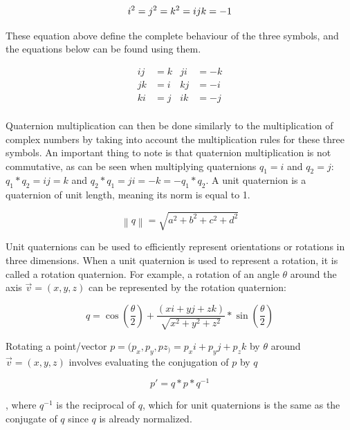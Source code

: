 		\begin{equation}
			i^2 = j^2 = k^2 = ijk = -1 \\
		\end{equation}
		
		These equation above define the complete behaviour of the three symbols, and the equations below can be found using them.
		
		\begin{align*}
			ij &= k & ji &= -k \\
			jk &= i & kj &= -i \\
			ki &= j & ik &= -j \\
		\end{align*}
		
		Quaternion multiplication can then be done similarly to the multiplication of complex numbers by taking into account the multiplication rules for these three symbols. An important thing to note is that quaternion multiplication is not commutative, as can be seen when multiplying quaternions \( q_1 = i \) and \( q_2 = j \): \( q_1*q_2 = ij = k \) and \( q_2*q_1 = ji = -k = -q_1*q_2 \). A unit quaternion is a quaternion of unit length, meaning its norm is equal to 1. 
		
		\begin{equation}
			\left \| q \right \| = \sqrt{a^2 + b^2 + c^2 + d^2}
		\end{equation}
		
		Unit quaternions can be used to efficiently represent orientations or rotations in three dimensions. When a unit quaternion is used to represent a rotation, it is called a rotation quaternion. For example, a rotation of an angle \( \theta \) around the axis \( \vec{v} = (x, y, z) \) can be represented by the rotation quaternion:
		
		\begin{equation}
			q = \cos(\frac{\theta}{2}) + \frac{(xi + yj + zk)}{\sqrt{x^2 + y^2 + z^2}}*\sin(\frac{\theta}{2})
		\end{equation}
		
		Rotating a point/vector \( p = (p_x, p_y, pz_) = p_xi + p_yj + p_zk \) by \( \theta \) around \( \vec{v} = (x, y, z) \) involves evaluating the conjugation of \( p \) by \( q \) 
		
		\begin{equation}
			p' = q*p*q^{-1}
		\end{equation}
		
		, where \( q^{-1} \) is the reciprocal of \( q \), which for unit quaternions is the same as the conjugate of \( q \) since \( q \) is already normalized.
		
